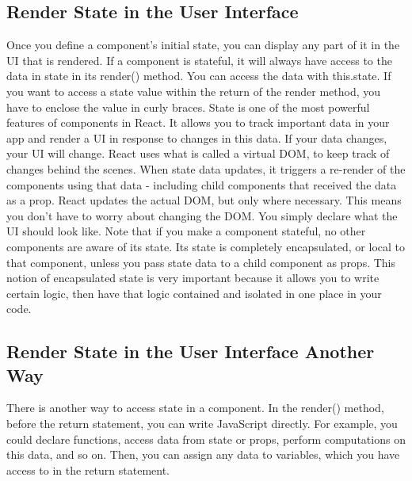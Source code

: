 \documentclass{article}%
\begin{document}
%
\subsection{Render State in the User Interface}%
\label{subsec:RenderStateintheUserInterface}%
Once you define a component's initial state, you can display any part of it in the UI that is rendered. If a component is stateful, it will always have access to the data in state in its render() method. You can access the data with this.state.\newline%
If you want to access a state value within the return of the render method, you have to enclose the value in curly braces.\newline%
State is one of the most powerful features of components in React. It allows you to track important data in your app and render a UI in response to changes in this data. If your data changes, your UI will change. React uses what is called a virtual DOM, to keep track of changes behind the scenes. When state data updates, it triggers a re{-}render of the components using that data {-} including child components that received the data as a prop. React updates the actual DOM, but only where necessary. This means you don't have to worry about changing the DOM. You simply declare what the UI should look like.\newline%
Note that if you make a component stateful, no other components are aware of its state. Its state is completely encapsulated, or local to that component, unless you pass state data to a child component as props. This notion of encapsulated state is very important because it allows you to write certain logic, then have that logic contained and isolated in one place in your code.\newline%

%
\subsection{Render State in the User Interface Another Way}%
\label{subsec:RenderStateintheUserInterfaceAnotherWay}%
There is another way to access state in a component. In the render() method, before the return statement, you can write JavaScript directly. For example, you could declare functions, access data from state or props, perform computations on this data, and so on. Then, you can assign any data to variables, which you have access to in the return statement.\newline%

%
\end{document}
